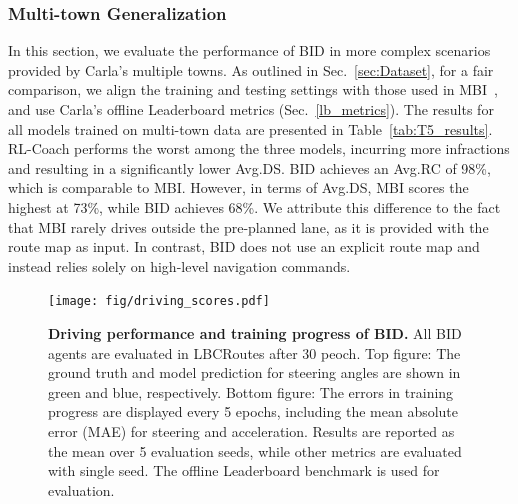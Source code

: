 \subsubsection{Multi-town Generalization}\label{sec:multi_towns_result}
\hspace{1pc}In this section, we evaluate the performance of BID in more complex scenarios provided by Carla's multiple towns. 
As outlined in Sec.~\ref{sec:Dataset}, for a fair comparison, we align the training and testing settings with those used in MBI~\cite{Hu:2022}, and use Carla's offline Leaderboard metrics (Sec.~\ref{lb_metrics}). 
The results for all models trained on multi-town data are presented in Table~\ref{tab:T5_results}. 
RL-Coach performs the worst among the three models, incurring more infractions and resulting in a significantly lower Avg.DS. 
BID achieves an Avg.RC of 98\%, which is comparable to MBI. 
However, in terms of Avg.DS, MBI scores the highest at 73\%, while BID achieves 68\%. 
We attribute this difference to the fact that MBI rarely drives outside the pre-planned lane, as it is provided with the route map as input. 
In contrast, BID does not use an explicit route map and instead relies solely on high-level navigation commands.

\begin{figure}[t]
	\centering
	\texttt{[image: fig/driving\_scores.pdf]}
	\vspace{-1ex}
	\caption{\textbf{Driving performance and training progress of BID.} 
		All BID agents are evaluated in LBCRoutes after 30 peoch.
		Top figure: The ground truth and model prediction for steering angles are shown in green and blue, respectively.
		Bottom figure: The errors in training progress are displayed every 5 epochs, including the mean absolute error (MAE) for steering and acceleration.
		Results are reported as the mean over 5 evaluation seeds, while other metrics are evaluated with single seed. 
		The offline Leaderboard benchmark is used for evaluation.}
	\vspace{-1.5ex}
	\label{fig:score_eu_lb_tt_tn}
\end{figure}


